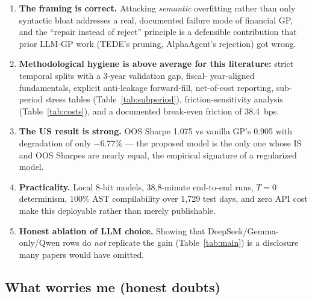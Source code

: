 \documentclass[11pt,a4paper]{article}
\begin{document}
\begin{enumerate}
  \item \textbf{The framing is correct.} Attacking \emph{semantic} overfitting
  rather than only syntactic bloat addresses a real, documented failure mode
  of financial GP, and the ``repair instead of reject'' principle is a
  defensible contribution that prior LLM-GP work (TEDE's pruning,
  AlphaAgent's rejection) got wrong.
  \item \textbf{Methodological hygiene is above average for this
  literature:} strict temporal splits with a 3-year validation gap, fiscal-
  year-aligned fundamentals, explicit anti-leakage forward-fill, net-of-cost
  reporting, sub-period stress tables (Table~\ref{tab:subperiod}),
  friction-sensitivity analysis (Table~\ref{tab:costs}), and a documented
  break-even friction of 38.4~bps.
  \item \textbf{The US result is strong.} OOS Sharpe 1.075 vs vanilla GP's
  0.905 with degradation of only $-6.77\%$ --- the proposed model is the only
  one whose IS and OOS Sharpes are nearly equal, the empirical signature of a
  regularized model.
  \item \textbf{Practicality.} Local 8-bit models, 38.8-minute end-to-end
  runs, $T=0$ determinism, 100\% AST compilability over 1{,}729 test days,
  and zero API cost make this deployable rather than merely publishable.
  \item \textbf{Honest ablation of LLM choice.} Showing that DeepSeek/Gemma-
  only/Qwen rows do \emph{not} replicate the gain (Table~\ref{tab:main})
  is a disclosure many papers would have omitted.
\end{enumerate}

\subsection*{What worries me (honest doubts)}
\end{document}
